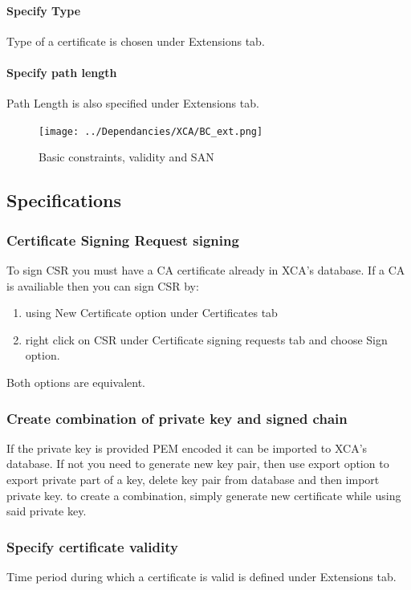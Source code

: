 \documentclass[10pt, a4paper]{report}
\begin{document}
      \paragraph{Specify Type}
Type of a certificate is chosen under Extensions tab.
      \paragraph{Specify path length}
Path Length is also specified under Extensions tab.

\begin{figure}[!ht]
 \caption{Basic constraints, validity and SAN}
 \centering
  \texttt{[image: ../Dependancies/XCA/BC\_ext.png]}
\end{figure}

  \subsection{Specifications}
  
    \subsubsection{Certificate Signing Request signing}
To sign CSR you must have a CA certificate already in XCA's database. If a CA is availiable then you can sign CSR by:

\begin{enumerate}
\item using New Certificate option under Certificates tab 
\item right click on CSR under Certificate signing requests tab and choose Sign option. 
\end{enumerate}
Both options are equivalent.    

    \subsubsection{Create combination of private key and signed chain}
If the private key is provided PEM encoded it can be imported to XCA's database. If not you need to generate new key pair, then use export option to export private part of a key, delete key pair from database and then import private key. to create a combination, simply generate new certificate while using said private key.
    \subsubsection{Specify certificate validity}
Time period during which a certificate is valid is defined under Extensions tab.
\end{document}
